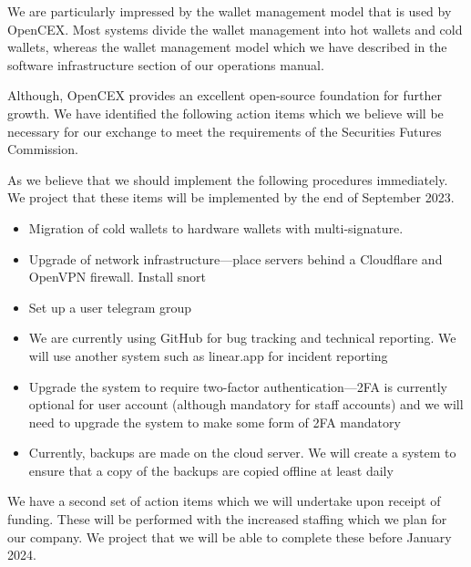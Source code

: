 \documentclass[]{report}
\begin{document}
We are particularly impressed by the wallet management model that is
used by OpenCEX.  Most systems divide the wallet management into hot
wallets and cold wallets, whereas the wallet management model which we
have described in the software infrastructure section of our
operations manual.

Although, OpenCEX provides an excellent open-source foundation for
further growth.  We have identified the following action items which
we believe will be necessary for our exchange to meet the requirements
of the Securities Futures Commission.

As we believe that we should implement the following procedures
immediately.  We project that these items will be implemented by the
end of September 2023.

\begin{itemize}
\item Migration of cold wallets to hardware wallets with
  multi-signature.

\item Upgrade of network infrastructure—place servers behind a Cloudflare and
OpenVPN firewall.  Install snort

\item Set up a user telegram group

\item We are currently using GitHub for bug tracking and technical
  reporting.  We will use another system such as linear.app for
  incident reporting

\item Upgrade the system to require two-factor authentication—2FA is
  currently optional for user account (although mandatory for staff
  accounts) and we will need to upgrade the system to make
  some form of 2FA mandatory

\item Currently, backups are made on the cloud server.  We will create
  a system to ensure that a copy of the backups are copied offline at
  least daily
\end{itemize}

We have a second set of action items which we will undertake upon
receipt of funding.  These will be performed with the
increased staffing which we plan for our company.  We project that we
will be able to complete these before January 2024.
\end{document}
